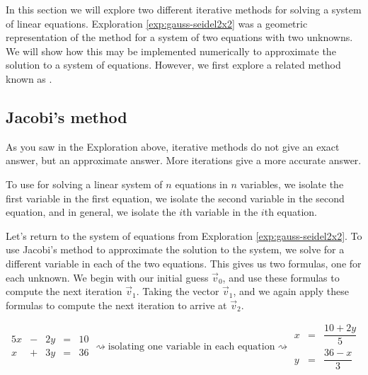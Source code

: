 \documentclass{ximera}
\begin{document}
In this section we will explore two different iterative methods for solving a system of linear equations.  Exploration \ref{exp:gauss-seidel2x2} was a geometric representation of the  method for a system of two equations with two unknowns.  We will show how this may be implemented numerically to approximate the solution to a system of equations.  However, we first  explore a related method known as .

\subsection*{Jacobi's method}
As you saw in the Exploration above, iterative methods do not give an exact answer, but an approximate answer.  More iterations give a more accurate answer.

To use  for solving a linear system of $n$ equations in $n$ variables, we isolate the first variable in the first equation, we isolate the second variable in the second equation, and in general, we isolate the $i$th variable in the $i$th equation.

Let's return to the system of equations from Exploration \ref{exp:gauss-seidel2x2}.  To use Jacobi's method to approximate the solution to the system, we solve for a different variable in each of the two equations.  This gives us two formulas, one for each unknown.  We begin with our initial guess $\vec{v}_0$, and use these formulas to compute the next iteration $\vec{v}_1$.  Taking the vector $\vec{v}_1$, and we again apply these formulas to compute the next iteration to arrive at $\vec{v}_2$.


\begin{equation*}\begin{array}{ccccc}
      5x& -&2y&=&10\\
      x & +&3y&= &36 
    \end{array}
\rightsquigarrow\text{isolating one variable in each equation}\rightsquigarrow
\begin{array}{ccc}
      x& =&\dfrac{10+2y}{5}\\
      y& =&\dfrac{36-x}{3}
    \end{array}
\end{equation*}
\end{document}

